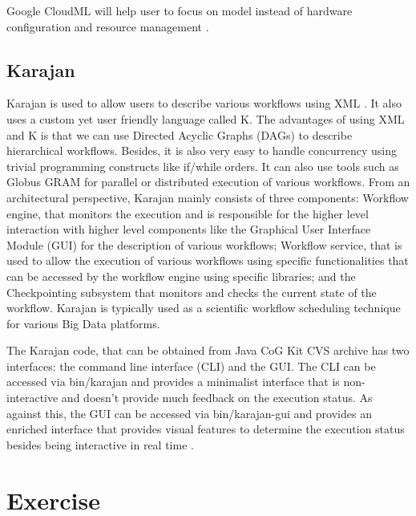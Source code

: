 {     Google CloudML will help user to focus on model instead of hardware
     configuration and resource management \cite{www-googlecloudoverview}.

\subsection{Karajan}

     Karajan is used to allow users to describe various workflows
     using XML \cite{RMBDP-Book-1}.  It also uses a custom yet user
     friendly language called K.  The advantages of using XML and K is
     that we can use Directed Acyclic Graphs (DAGs) to describe
     hierarchical workflows.  Besides, it is also very easy to handle
     concurrency using trivial programming constructs like if/while
     orders.  It can also use tools such as Globus GRAM for parallel
     or distributed execution of various workflows.  From an
     architectural perspective, Karajan mainly consists of three
     components: Workflow engine, that monitors the execution and is
     responsible for the higher level interaction with higher level
     components like the Graphical User Interface Module (GUI) for the
     description of various workflows; Workflow service, that is used
     to allow the execution of various workflows using specific
     functionalities that can be accessed by the workflow engine using
     specific libraries; and the Checkpointing subsystem that monitors
     and checks the current state of the workflow.  Karajan is
     typically used as a scientific workflow scheduling technique for
     various Big Data platforms.

     The Karajan code, that can be obtained from Java CoG Kit CVS
     archive has two interfaces: the command line interface (CLI) and
     the GUI.  The CLI can be accessed via bin/karajan and provides a
     minimalist interface that is non-interactive and doesn't provide
     much feedback on the execution status.  As against this, the GUI
     can be accessed via bin/karajan-gui and provides an enriched
     interface that provides visual features to determine the
     execution status besides being interactive in real time
     \cite{Karajan-interfaces}.


\section{Exercise}

\begin{description}


\end{description}}
